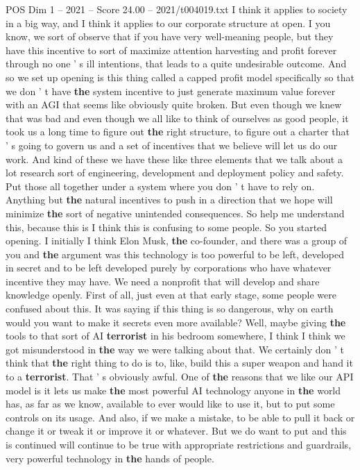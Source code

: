 \begin{textsample}{POS Dim 1 – 2021 – Score 24.00 – 2021/t004019.txt}
I think it applies to society in a big way, and I think it applies to our corporate structure at open.
I you know, we sort of observe that if you have very well-meaning people, but they have this incentive to sort of maximize attention harvesting and profit forever through no one ' s ill intentions, that leads to a quite undesirable outcome.
And so we set up opening is this thing called a capped profit model specifically so that we don ' t have \textbf{the} system incentive to just generate maximum value forever with an AGI that seems like obviously quite broken.
But even though we knew that was bad and even though we all like to think of ourselves as good people, it took us a long time to figure out \textbf{the} right structure, to figure out a charter that ' s going to govern us and a set of incentives that we believe will let us do our work.
And kind of these we have these like three elements that we talk about a lot research sort of engineering, development and deployment policy and safety.
Put those all together under a system where you don ' t have to rely on.
Anything but \textbf{the} natural incentives to push in a direction that we hope will minimize \textbf{the} sort of negative unintended consequences.
So help me understand this, because this is I think this is confusing to some people.
So you started opening.
I initially I think Elon Musk, \textbf{the} co-founder, and there was a group of you and \textbf{the} argument was this technology is too powerful to be left, developed in secret and to be left developed purely by corporations who have whatever incentive they may have.
We need a nonprofit that will develop and share knowledge openly.
First of all, just even at that early stage, some people were confused about this.
It was saying if this thing is so dangerous, why on earth would you want to make it secrets even more available?
Well, maybe giving \textbf{the} tools to that sort of AI \textbf{terrorist} in his bedroom somewhere, I think I think we got misunderstood in \textbf{the} way we were talking about that.
We certainly don ' t think that \textbf{the} right thing to do is to, like, build this a super weapon and hand it to a \textbf{terrorist}.
That ' s obviously awful.
One of \textbf{the} reasons that we like our API model is it lets us make \textbf{the} most powerful AI technology anyone in \textbf{the} world has, as far as we know, available to ever would like to use it, but to put some controls on its usage.
And also, if we make a mistake, to be able to pull it back or change it or tweak it or improve it or whatever.
But we do want to put and this is continued will continue to be true with appropriate restrictions and guardrails, very powerful technology in \textbf{the} hands of people.

\end{textsample}

